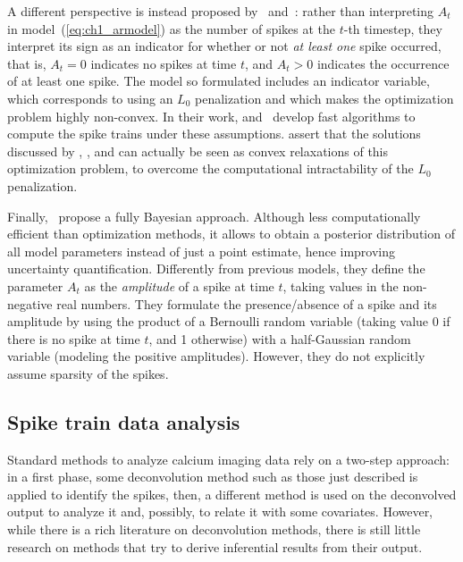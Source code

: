 A different perspective is instead proposed by~\citet{jewell2018} and~\citet{jewell2019}: rather than interpreting $A_t$ in model~(\ref{eq:ch1_armodel}) as the number of spikes at the $t$-th timestep, they interpret its sign as an indicator for whether or not \textit{at least one} spike occurred, that is, $A_t = 0$ indicates no spikes at time $t$, and $A_t>0$ indicates the occurrence of at least one spike. The model so formulated includes an indicator variable, which corresponds to using an $L_0$ penalization and which makes the optimization problem highly non-convex. 
In their work, \citet{jewell2018} and~\citet{jewell2019} develop fast algorithms to compute the spike trains under these assumptions.
\citet{jewell2018} assert that the solutions discussed by \citet{vogelstein2010}, \citet{friedrich2016}, and \citet{friedrich2017} can actually be seen as convex relaxations of this optimization problem, to overcome the computational intractability of the $L_0$ penalization. 

Finally,~\citet{pnevmatikakis2013} propose a fully Bayesian approach. Although less computationally efficient than optimization methods, it allows to obtain a posterior distribution of all model parameters instead of just a point estimate, hence improving uncertainty quantification.
Differently from previous models, they define the parameter $A_t$ as the \textit{amplitude} of a spike at time $t$, taking values in the non-negative real numbers.
They formulate the presence/absence of a spike and its amplitude by using the product of a Bernoulli random variable (taking value 0 if there is no spike at time $t$, and 1 otherwise) with a half-Gaussian random variable (modeling the positive amplitudes). However, they do not explicitly assume sparsity of the spikes.


\subsection{Spike train data analysis}
\label{subsec:ch1_spike_analysis}
Standard methods to analyze calcium imaging data rely on a two-step approach: in a first phase, some deconvolution method such as those just described is applied to identify the spikes, then, a different method is used on the deconvolved output to analyze it and, possibly, to relate it with some covariates.
However, while there is a rich literature on deconvolution methods, there is still little research on methods that try to derive inferential results from their output.

